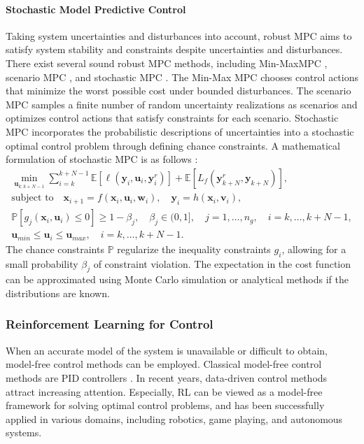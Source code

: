 \paragraph{Stochastic Model Predictive Control}
Taking system uncertainties and disturbances into account, robust \ac{MPC} \citep{rmpc1987} aims to satisfy system stability and constraints despite uncertainties and disturbances. There exist several sound robust \ac{MPC} methods, including Min-Max\ac{MPC} \citep{RAIMONDO20095}, scenario \ac{MPC} \citep{Calafiore_2013}, and stochastic \ac{MPC} \citep{HEIRUNG2018158,smpc2016}. The Min-Max \ac{MPC} chooses control actions that minimize the worst possible cost under bounded disturbances. The scenario \ac{MPC} samples a finite number of random uncertainty realizations as scenarios and optimizes control actions that satisfy constraints for each scenario. Stochastic \ac{MPC} incorporates the probabilistic descriptions of uncertainties into a stochastic optimal control problem through defining chance constraints. A mathematical formulation of stochastic \ac{MPC} is as follows \citep{HEIRUNG2018158} :
\begin{subequations}
    \label{eq:smpc}
    \begin{gather}
        \min_{\boldsymbol{u}_{k:k+N-1}}\sum_{i=k}^{k+N-1}\mathbb{E}[\ell(\boldsymbol{y}_{i}, \boldsymbol{u}_{i}, \boldsymbol{y}^r_{i})]+\mathbb{E}[L_f(\boldsymbol{y}^r_{k+N},\boldsymbol{y}_{k+N})],\\
        \text{subject to} \quad \boldsymbol{x}_{i+1} = f(\boldsymbol{x}_i, \boldsymbol{u}_i, \boldsymbol{w}_i), \quad \boldsymbol{y}_i = h(\boldsymbol{x}_i, \boldsymbol{v}_i),\\
        \mathbb{P}[g_j(\boldsymbol{x}_i, \boldsymbol{u}_i)\leq 0]\geq1-\beta_j, \quad\beta_j\in(0,1],\quad j=1,\ldots,n_g, \quad i=k,\ldots,k+N-1,\\
        \boldsymbol{u}_{min}\leq\boldsymbol{u}_i\leq\boldsymbol{u}_{max}, \quad i=k,\ldots,k+N-1.
    \end{gather}    
\end{subequations}   
The chance constraints $\mathbb{P}$ regularize the inequality constraints $g_i$, allowing for a small probability $\beta_j$ of constraint violation. The expectation in the cost function can be approximated using Monte Carlo simulation or analytical methods if the distributions are known.                                                                                                                                                                              
\subsubsection{Reinforcement Learning for Control}
When an accurate model of the system is unavailable or difficult to obtain, model-free control methods can be employed. Classical model-free control methods are \ac{PID} controllers \citep{Fliess_2013}. In recent years, data-driven control methods attract increasing attention. Especially, \acf{RL} can be viewed as a model-free framework for solving optimal control problems, and has been successfully applied in various domains, including robotics, game playing, and autonomous systems.

